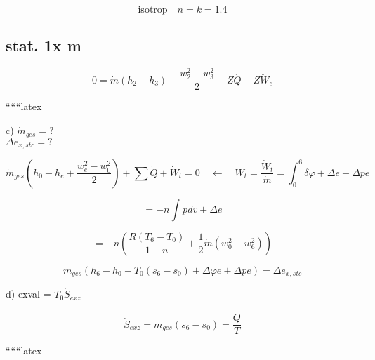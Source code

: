\[
\text{isotrop} \quad n = k = 1.4
\]

\subsection*{stat. 1x m}
\[
0 = \dot{m} \left( h_2 - h_3 \right) + \frac{w_2^2 - w_3^2}{2} + \dot{Z} \ddot{Q} - \dot{Z} \ddot{W}_e
\]

``````latex

c) $\dot{m}_{ges} = ?$ \\
$\Delta e_{x,stc} = ?$

\[
\dot{m}_{ges} \left( h_0 - h_e + \frac{w_e^2 - w_0^2}{2} \right) + \sum \dot{Q} + \dot{W}_t = 0 \quad \leftarrow \quad W_t = \frac{\dot{W}_t}{\dot{m}} = \int_{0}^{6} \delta \varphi + \Delta e + \Delta pe
\]

\[
= -n \int pdv + \Delta e
\]

\[
= -n \left( \frac{R \left( T_6 - T_0 \right)}{1 - n} + \frac{1}{2} \dot{m} \left( w_0^2 - w_6^2 \right) \right)
\]

\[
\dot{m}_{ges} \left( h_6 - h_0 - T_0 \left( s_6 - s_0 \right) + \Delta \varphi e + \Delta pe \right) = \Delta e_{x,stc}
\]

d) exval = $T_0 \dot{S}_{exz}$

\[
\dot{S}_{exz} = \dot{m}_{ges} \left( s_6 - s_0 \right) = \frac{\dot{Q}}{T}
\]

``````latex


